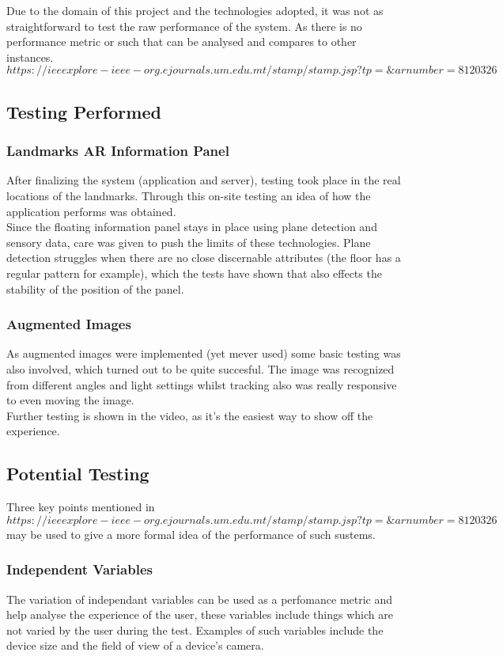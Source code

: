 Due to the domain of this project and the technologies adopted, it was not as straightforward to 
test the raw performance of the system. As there is no performance metric or such that can be 
analysed and compares to other instances. \[https://ieeexplore-ieee-org.ejournals.um.edu.mt/stamp/stamp.jsp?tp=\&arnumber=8120326\] 
\subsection{Testing Performed}

\subsubsection{Landmarks AR Information Panel}
After finalizing the system (application and server), testing took place in the 
real locations of the landmarks. Through this on-site testing an idea of how the application 
performs was obtained.\\
Since the floating information panel stays in place using plane detection and sensory data, care 
was given to push the limits of these technologies. Plane detection struggles when there are 
no close discernable attributes (the floor has a regular pattern for example), which the tests 
have shown that also effects the stability of the position of the panel. 
\subsubsection{Augmented Images}
As augmented images were implemented (yet mever used) some basic testing was also involved, 
which turned out to be quite succesful. The image was recognized from different angles and 
light settings whilst tracking also was really responsive to even moving the image.  
\\
Further testing is shown in the video, as it's the easiest way to show off the experience.
\subsection{Potential Testing}
Three key points mentioned in \[https://ieeexplore-ieee-org.ejournals.um.edu.mt/stamp/stamp.jsp?tp=\&arnumber=8120326\] 
may be used to give a more formal idea of the performance of such sustems. 
\subsubsection{Independent Variables}
The variation of independant variables can be used as a perfomance metric and help analyse 
the experience of the user, these variables include things which are not varied by the user during 
the test. Examples of such variables include the device size and the field of view of a device's 
camera.\\
